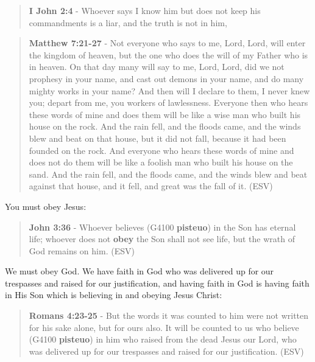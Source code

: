 \documentclass[11pt]{article}
\begin{document}
\begin{quote}
\textbf{I John 2:4} - Whoever says I know him but does not keep his commandments is a liar, and the truth is not in him,
\end{quote}

\begin{quote}
\textbf{Matthew 7:21-27} - Not everyone who says to me, Lord, Lord, will enter the kingdom of heaven, but the one who does the will of my Father who is in heaven.  On that day many will say to me, Lord, Lord, did we not prophesy in your name, and cast out demons in your name, and do many mighty works in your name?  And then will I declare to them, I never knew you; depart from me, you workers of lawlessness.  Everyone then who hears these words of mine and does them will be like a wise man who built his house on the rock.  And the rain fell, and the floods came, and the winds blew and beat on that house, but it did not fall, because it had been founded on the rock.  And everyone who hears these words of mine and does not do them will be like a foolish man who built his house on the sand.  And the rain fell, and the floods came, and the winds blew and beat against that house, and it fell, and great was the fall of it. (ESV)
\end{quote}

You must obey Jesus:

\begin{quote}
\textbf{John 3:36} - Whoever believes (G4100 \textbf{pisteuo}) in the Son has eternal life; whoever does not \textbf{obey} the Son shall not see life, but the wrath of God remains on him. (ESV)
\end{quote}

We must obey God. We have faith in God who was delivered up for our trespasses and raised for our justification, and having faith in God is having faith in His Son which is believing in and obeying Jesus Christ:

\begin{quote}
\textbf{Romans 4:23-25} - But the words it was counted to him were not written for his sake alone, but for ours also. It will be counted to us who believe (G4100 \textbf{pisteuo}) in him who raised from the dead Jesus our Lord, who was delivered up for our trespasses and raised for our justification. (ESV)
\end{quote}
\end{document}
